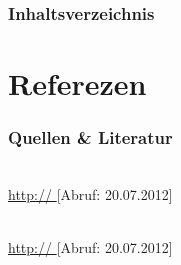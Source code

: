\documentclass{beamer} 								%
\begin{document}
\begin{frame}
	\frametitle{Inhaltsverzeichnis}\tableofcontents
\end{frame}















\section[Quellen]{Referezen}
\begin{frame}\frametitle{Quellen \& Literatur}

\begin{thebibliography}{1}
 \emph{ } \\
\url{http:// } [Abruf: 20.07.2012]\\
\end{thebibliography}

\begin{thebibliography}{2}
 \emph{ } \\
\url{http:// } [Abruf: 20.07.2012]\\
\end{thebibliography}

\end{frame}
\end{document}
